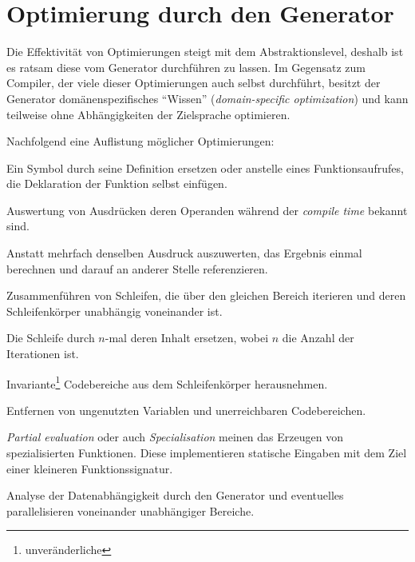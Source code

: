 \section{Optimierung durch den Generator}

Die Effektivität von Optimierungen steigt mit dem Abstraktionslevel, deshalb ist es ratsam diese vom Generator durchführen zu lassen. Im Gegensatz zum Compiler, der viele dieser Optimierungen auch selbst durchführt, besitzt der Generator domänenspezifisches \enquote{Wissen} (\emph{domain-specific optimization}) und kann teilweise ohne Abhängigkeiten der Zielsprache optimieren.

Nachfolgend eine Auflistung möglicher Optimierungen:

\begin{description}[style=nextline]
\item[Inlining]
    Ein Symbol durch seine Definition ersetzen oder anstelle eines Funktionsaufrufes, die Deklaration der Funktion selbst einfügen.
\item[Constant folding]
    Auswertung von Ausdrücken deren Operanden während der \emph{compile time} bekannt sind.
\item[Data caching]
    Anstatt mehrfach denselben Ausdruck auszuwerten, das Ergebnis einmal berechnen und darauf an anderer Stelle referenzieren.
\item[Loop fusion]
    Zusammenführen von Schleifen, die über den gleichen Bereich iterieren und deren Schleifenkörper unabhängig voneinander ist.
\item[Loop unrolling]
    Die Schleife durch $n$-mal deren Inhalt ersetzen, wobei $n$ die Anzahl der Iterationen ist.
\item[Code motion]
    Invariante\footnote{unveränderliche} Codebereiche aus dem Schleifenkörper herausnehmen.
\item[Dead-code elimination]
    Entfernen von ungenutzten Variablen und unerreichbaren Codebereichen.
\item[Partial evaluation/Specialisation]
    \emph{Partial evaluation} oder auch \emph{Specialisation} meinen das Erzeugen von spezialisierten Funktionen. Diese implementieren statische Eingaben mit dem Ziel einer kleineren Funktionssignatur.
\item[Parallelization]
    Analyse der Datenabhängigkeit durch den Generator und eventuelles parallelisieren voneinander unabhängiger Bereiche.
\end{description}
